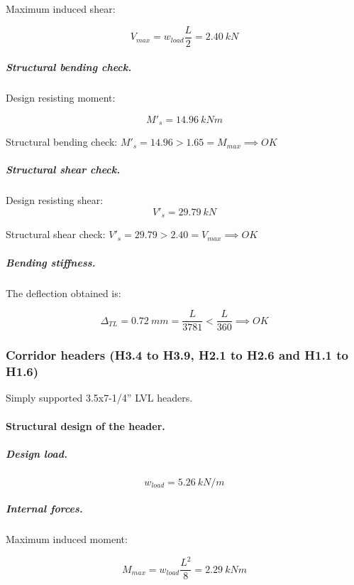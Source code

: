\noindent Maximum induced shear:

\begin{equation}
  V_{max}= w_{load} \frac{L}{2}= 2.40\ kN
\end{equation}

\subparagraph{Structural bending check.}

\noindent Design resisting moment:

\begin{equation}
  M'_s= 14.96\ kN m
\end{equation}

\noindent Structural bending check: $M'_s = 14.96 > 1.65 = M_{max} \implies OK$

\subparagraph{Structural shear check.}

\noindent Design resisting shear:
\begin{equation}
  V'_s= 29.79\ kN
\end{equation}

\noindent Structural shear check: $V'_s = 29.79 > 2.40 = V_{max} \implies OK$

\subparagraph{Bending stiffness.}
The deflection obtained is:

\begin{equation}
  \Delta_{TL}= 0.72\ mm= \frac{L}{3781} < \frac{L}{360} \implies OK
\end{equation}

\subsubsection{Corridor headers (H3.4 to H3.9, H2.1 to H2.6 and H1.1 to H1.6)}
Simply supported 3.5x7-1/4'' LVL headers.

\paragraph{Structural design of the header.}

\subparagraph{Design load.}

\begin{equation}
  w_{load}= 5.26\ kN/m
\end{equation}

\subparagraph{Internal forces.}

\noindent Maximum induced moment:

\begin{equation}
  M_{max}= w_{load} \frac{L^2}{8}= 2.29\ kN m
\end{equation}

